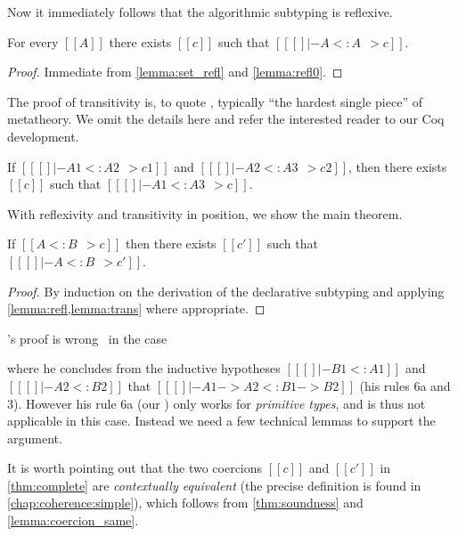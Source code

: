 Now it immediately follows that the algorithmic subtyping is reflexive.

\begin{lemma} \label{lemma:refl}
  For every $[[A]]$ there exists $[[c]]$ such that $[[ [] |- A <: A ~~> c]]$.
\end{lemma}
\begin{proof}
  Immediate from \cref{lemma:set_refl} and \cref{lemma:refl0}.
\end{proof}

The proof of transitivity is, to quote \citet{pierce1989decision}, typically
``the hardest single piece'' of metatheory. We omit the details here and
refer the interested reader to our Coq development.

\begin{lemma} \label{lemma:trans}
  If $[[ [] |- A1 <: A2 ~~> c1]]$ and $[[ [] |- A2 <: A3 ~~> c2]]$, then there
  exists $[[c]]$ such that $[[ [] |- A1 <: A3 ~~> c]]$.
\end{lemma}

With reflexivity and transitivity in position, we show the main theorem.

\begin{theorem} \label{thm:complete}
  If $[[A <: B ~~> c]]$ then there exists $[[c']]$ such that $[[ [] |- A <: B ~~> c']]$.
\end{theorem}
\begin{proof}
  By induction on the derivation of the declarative subtyping and applying \cref{lemma:refl,lemma:trans} where appropriate.
\end{proof}
\begin{remark}
  \citeauthor{pierce1989decision}'s proof is wrong~\cite[pp.~20, Case~F]{pierce1989decision} in the case
  \begin{mathpar}
  \end{mathpar}
  where he concludes from the inductive
  hypotheses $[[ [] |- B1 <: A1]]$ and $[[ [] |- A2 <: B2]]$ that $[[ [] |- A1 -> A2 <: B1 -> B2]]$ (his rules 6a and 3).
  However his rule 6a (our ) only works for \emph{primitive types}, and is thus not applicable in this case. Instead we
  need a few technical lemmas to support the argument.
\end{remark}

\begin{remark}
  It is worth pointing out that the two coercions $[[c]]$ and $[[c']]$ in
  \cref{thm:complete} are \emph{contextually equivalent} (the precise
  definition is found in \cref{chap:coherence:simple}), which follows from
  \cref{thm:soundness} and \cref{lemma:coercion_same}.
\end{remark}

